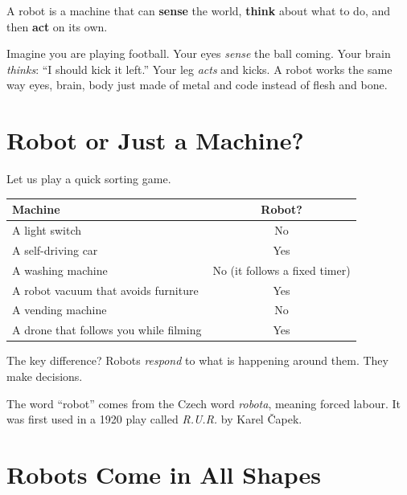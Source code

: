 \begin{bigidea}
  A robot is a machine that can \textbf{sense} the world, \textbf{think}
  about what to do, and then \textbf{act} on its own.
\end{bigidea}

\begin{picturethis}
  Imagine you are playing football. Your eyes \emph{sense} the ball coming.
  Your brain \emph{thinks}: ``I should kick it left.'' Your leg \emph{acts}
  and kicks. A robot works the same way \textemdash{} eyes, brain, body \textemdash{}
  just made of metal and code instead of flesh and bone.
\end{picturethis}

\sectionrule

\section*{Robot or Just a Machine?}

Let us play a quick sorting game.

\begin{center}
\begin{tabularx}{0.85\textwidth}{|X|c|}
  \hline
  \textbf{Machine} & \textbf{Robot?} \\
  \hline
  A light switch & No \\
  \hline
  A self-driving car & Yes \\
  \hline
  A washing machine & No (it follows a fixed timer) \\
  \hline
  A robot vacuum that avoids furniture & Yes \\
  \hline
  A vending machine & No \\
  \hline
  A drone that follows you while filming & Yes \\
  \hline
\end{tabularx}
\end{center}

The key difference? Robots \emph{respond} to what is happening around them.
They make decisions.

\begin{funfact}
  The word ``robot'' comes from the Czech word \emph{robota}, meaning
  forced labour. It was first used in a 1920 play called \emph{R.U.R.}
  by Karel \v{C}apek.
\end{funfact}

\sectionrule

\section*{Robots Come in All Shapes}

